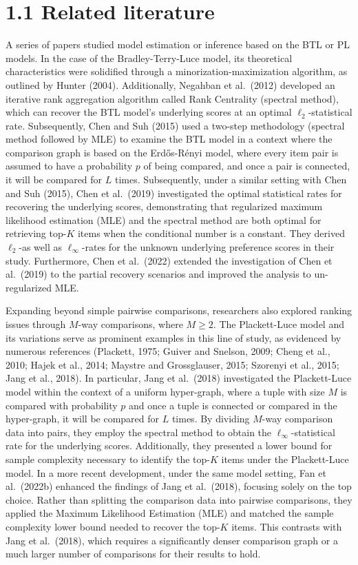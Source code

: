 \section{1.1 Related literature}\label{related-literature}

A series of papers studied model estimation or inference based on the BTL or PL models. In the case of the Bradley-Terry-Luce model, its theoretical characteristics were solidified through a minorization-maximization algorithm, as outlined by Hunter (2004). Additionally, Negahban et al.~(2012) developed an iterative rank aggregation algorithm called Rank Centrality (spectral method), which can recover the BTL model's underlying scores at an optimal \(\ell_2\)-statistical rate. Subsequently, Chen and Suh (2015) used a two-step methodology (spectral method followed by MLE) to examine the BTL model in a context where the comparison graph is based on the Erdős-Rényi model, where every item pair is assumed to have a probability \(p\) of being compared, and once a pair is connected, it will be compared for \(L\) times. Subsequently, under a similar setting with Chen and Suh (2015), Chen et al.~(2019) investigated the optimal statistical rates for recovering the underlying scores, demonstrating that regularized maximum likelihood estimation (MLE) and the spectral method are both optimal for retrieving top-\(K\) items when the conditional number is a constant. They derived \(\ell_2\)-as well as \(\ell_\infty\)-rates for the unknown underlying preference scores in their study. Furthermore, Chen et al.~(2022) extended the investigation of Chen et al.~(2019) to the partial recovery scenarios and improved the analysis to un-regularized MLE.

Expanding beyond simple pairwise comparisons, researchers also explored ranking issues through \(M\)-way comparisons, where \(M \geq 2\). The Plackett-Luce model and its variations serve as prominent examples in this line of study, as evidenced by numerous references (Plackett, 1975; Guiver and Snelson, 2009; Cheng et al., 2010; Hajek et al., 2014; Maystre and Grossglauser, 2015; Szorenyi et al., 2015; Jang et al., 2018). In particular, Jang et al.~(2018) investigated the Plackett-Luce model within the context of a uniform hyper-graph, where a tuple with size \(M\) is compared with probability \(p\) and once a tuple is connected or compared in the hyper-graph, it will be compared for \(L\) times. By dividing \(M\)-way comparison data into pairs, they employ the spectral method to obtain the \(\ell_\infty\)-statistical rate for the underlying scores. Additionally, they presented a lower bound for sample complexity necessary to identify the top-\(K\) items under the Plackett-Luce model. In a more recent development, under the same model setting, Fan et al.~(2022b) enhanced the findings of Jang et al.~(2018), focusing solely on the top choice. Rather than splitting the comparison data into pairwise comparisons, they applied the Maximum Likelihood Estimation (MLE) and matched the sample complexity lower bound needed to recover the top-\(K\) items. This contrasts with Jang et al.~(2018), which requires a significantly denser comparison graph or a much larger number of comparisons for their results to hold.

